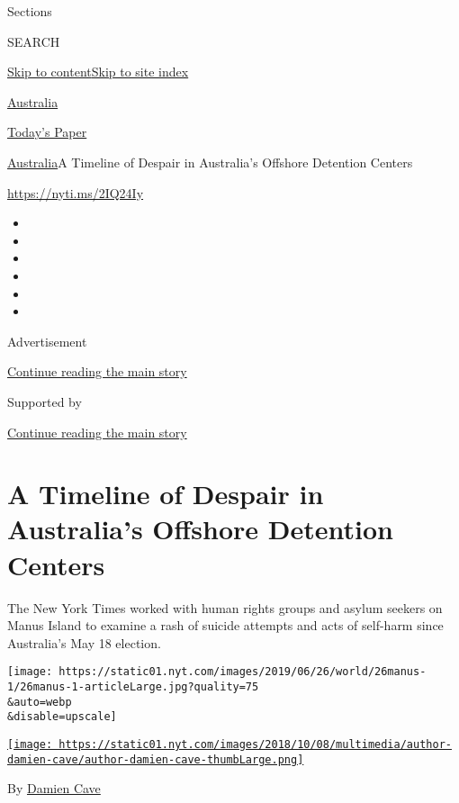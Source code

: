 Sections

SEARCH

\protect\hyperlink{site-content}{Skip to
content}\protect\hyperlink{site-index}{Skip to site index}

\href{https://www.nytimes.com/section/world/australia}{Australia}

\href{https://myaccount.nytimes.com/auth/login?response_type=cookie\&client_id=vi}{}

\href{https://www.nytimes.com/section/todayspaper}{Today's Paper}

\href{/section/world/australia}{Australia}\textbar{}A Timeline of
Despair in Australia's Offshore Detention Centers

\url{https://nyti.ms/2IQ24Iy}

\begin{itemize}
\item
\item
\item
\item
\item
\item
\end{itemize}

Advertisement

\protect\hyperlink{after-top}{Continue reading the main story}

Supported by

\protect\hyperlink{after-sponsor}{Continue reading the main story}

\hypertarget{a-timeline-of-despair-in-australias-offshore-detention-centers}{%
\section{A Timeline of Despair in Australia's Offshore Detention
Centers}\label{a-timeline-of-despair-in-australias-offshore-detention-centers}}

The New York Times worked with human rights groups and asylum seekers on
Manus Island to examine a rash of suicide attempts and acts of self-harm
since Australia's May 18 election.

\texttt{[image: https://static01.nyt.com/images/2019/06/26/world/26manus-1/26manus-1-articleLarge.jpg?quality=75\\\&auto=webp\\\&disable=upscale]}

\href{https://www.nytimes.com/by/damien-cave}{\texttt{[image: https://static01.nyt.com/images/2018/10/08/multimedia/author-damien-cave/author-damien-cave-thumbLarge.png]}}

By \href{https://www.nytimes.com/by/damien-cave}{Damien Cave}

